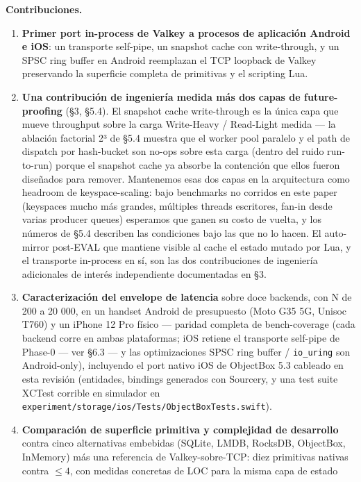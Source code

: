 \textbf{Contribuciones.}

\begin{enumerate}
\def\labelenumi{\arabic{enumi}.}
\tightlist
\item
  \textbf{Primer port in-process de Valkey a procesos de aplicación Android e
  iOS}: un transporte self-pipe, un snapshot cache con write-through, y un SPSC
  ring buffer en Android reemplazan el TCP loopback de Valkey preservando la
  superficie completa de primitivas y el scripting Lua.
\item
  \textbf{Una contribución de ingeniería medida más dos capas de
  future-proofing} (§3, §5.4). El snapshot cache write-through es la única capa
  que mueve throughput sobre la carga Write-Heavy / Read-Light medida --- la
  ablación factorial 2³ de §5.4 muestra que el worker pool paralelo y el path de
  dispatch por hash-bucket son no-ops sobre esta carga (dentro del ruido
  run-to-run) porque el snapshot cache ya absorbe la contención que ellos fueron
  diseñados para remover. Mantenemos esas dos capas en la arquitectura como
  headroom de keyspace-scaling: bajo benchmarks no corridos en este paper
  (keyspaces mucho más grandes, múltiples threads escritores, fan-in desde
  varias producer queues) esperamos que ganen su costo de vuelta, y los números
  de §5.4 describen las condiciones bajo las que no lo hacen. El auto-mirror
  post-EVAL que mantiene visible al cache el estado mutado por Lua, y el
  transporte in-process en sí, son las dos contribuciones de ingeniería
  adicionales de interés independiente documentadas en §3.
\item
  \textbf{Caracterización del envelope de latencia} sobre doce backends, con N
  de 200 a 20 000, en un handset Android de presupuesto (Moto G35 5G, Unisoc
  T760) y un iPhone 12 Pro físico --- paridad completa de bench-coverage (cada
  backend corre en ambas plataformas; iOS retiene el transporte self-pipe de
  Phase-0 --- ver §6.3 --- y las optimizaciones SPSC ring buffer /
  \texttt{io\_uring} son Android-only), incluyendo el port nativo iOS de
  ObjectBox 5.3 cableado en esta revisión (entidades, bindings generados con
  Sourcery, y una test suite XCTest corrible en simulador en
  \texttt{experiment/storage/ios/Tests/ObjectBoxTests.swift}).
\item
  \textbf{Comparación de superficie primitiva y complejidad de desarrollo}
  contra cinco alternativas embebidas (SQLite, LMDB, RocksDB, ObjectBox,
  InMemory) más una referencia de Valkey-sobre-TCP: diez primitivas nativas
  contra \(\leq 4\), con medidas concretas de LOC para la misma capa de estado

\end{enumerate}
